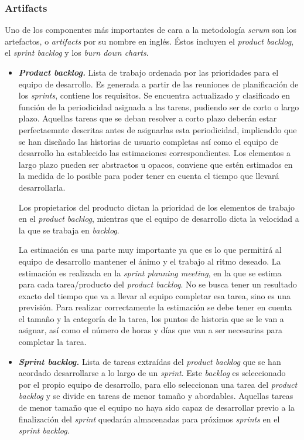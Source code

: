\subsubsection{Artifacts}
Uno de los componentes más importantes de cara a la metodología \textit{scrum} son los artefactos, o \textit{artifacts} por su nombre en inglés. Éstos incluyen el \textit{product backlog}, el \textit{sprint backlog} y los \textit{burn down charts}.
\begin{itemize}
\item \textbf{\textit{Product backlog.}} Lista de trabajo ordenada por las prioridades para el equipo de desarrollo. Es generada a partir de las reuniones de planificación de los \textit{sprints}, contiene los requisitos. Se encuentra actualizado y clasificado en función de la periodicidad asignada a las tareas, pudiendo ser de corto o largo plazo. Aquellas tareas que se deban resolver a corto plazo deberán estar perfectaemnte descritas antes de asignarlas esta periodicidad, implicnddo que se han diseñado las historias de usuario completas así como el equipo de desarrollo ha establecido las estimaciones correspondientes. Los elementos a largo plazo pueden ser abstractos u opacos, conviene que estén estimados en la medida de lo posible para poder tener en cuenta el tiempo que llevará desarrollarla.

Los propietarios del producto dictan la prioridad de los elementos de trabajo en el \textit{product backlog}, mientras que el equipo de desarrollo dicta la velocidad a la que se trabaja en \textit{backlog}.\cite{danradigan2021}

La estimación es una parte muy importante ya que es lo que permitirá al equipo de desarrollo mantener el ánimo y el trabajo al ritmo deseado. La estimación es realizada en la \textit{sprint planning meeting}, en la que se estima para cada tarea/producto del \textit{product backlog}. No se busca tener un resultado exacto del tiempo que va a llevar al equipo completar esa tarea, sino es una previsión. Para realizar correctamente la estimación se debe tener en cuenta el tamaño y la categoría de la tarea, los puntos de historia que se le van a asignar, así como el número de horas y días que van a ser necesarias para completar la tarea. 

\item \textbf{\textit{Sprint backlog.}} Lista de tareas extraídas del \textit{product backlog} que se han acordado desarrollarse a lo largo de un \textit{sprint}. Este \textit{backlog} es seleccionado por el propio equipo de desarrollo, para ello seleccionan una tarea del \textit{product backlog} y se divide en tareas de menor tamaño y abordables. Aquellas tareas de menor tamaño que el equipo no haya sido capaz de desarrollar previo a la finalización del \textit{sprint} quedarán almacenadas para próximos \textit{sprints} en el \textit{sprint backlog}.
\end{itemize}

